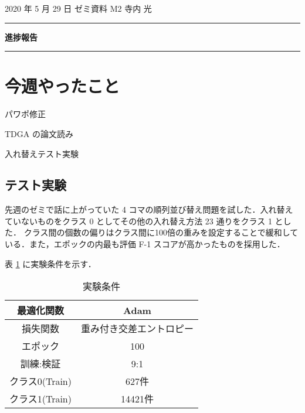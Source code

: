 \documentclass[onecolumn]{ujarticle}   %
\begin{document}
	\noindent

	\hspace{1em}
	2020 年 5 月 29 日
	ゼミ資料
	\hfill
	M2 寺内 光

	\vspace{2mm}

	\hrule

	\begin{center}
		{\Large \bf 進捗報告}
	\end{center}


	\hrule
	\vspace{3mm}

	\section{今週やったこと}
	\begin{itemize}{
		\item{パワポ修正}
		\item{TDGA の論文読み}
		\item{入れ替えテスト実験}
	}\end{itemize}

	\subsection{テスト実験}
	先週のゼミで話に上がっていた 4 コマの順列並び替え問題を試した．入れ替えていないものをクラス 0 としてその他の入れ替え方法 23 通りをクラス 1 とした．
	クラス間の個数の偏りはクラス間に100倍の重みを設定することで緩和している．また，エポックの内最も評価 F-1 スコアが高かったものを採用した．

	表 \ref{tab:cond_exp1} に実験条件を示す．

	\begin{table}[h]
		\centering
		\caption{実験条件}
		\vspace{-4mm}
		\label{tab:cond_exp1}
		\begin{tabular}{|c||c|} \hline
			最適化関数&Adam\\ \hline
			損失関数&重み付き交差エントロピー\\ \hline
			エポック&100\\ \hline
			訓練:検証&9:1\\ \hline
			クラス0(Train)&627件\\ \hline
			クラス1(Train)&14421件\\ \hline
		\end{tabular}
	\end{table}
\end{document}
